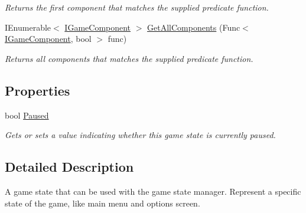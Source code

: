 \begin{DoxyCompactItemize}
\begin{DoxyCompactList}\small\item\em Returns the first component that matches the supplied predicate function. \end{DoxyCompactList}\item 
I\-Enumerable$<$ \hyperlink{interface_tri_devs_1_1_tri_engine_1_1_interfaces_1_1_i_game_component}{I\-Game\-Component} $>$ \hyperlink{interface_tri_devs_1_1_tri_engine_1_1_state_management_1_1_i_game_state_ae644df89b412d1803ae5000592aadb2b}{Get\-All\-Components} (Func$<$ \hyperlink{interface_tri_devs_1_1_tri_engine_1_1_interfaces_1_1_i_game_component}{I\-Game\-Component}, bool $>$ func)
\begin{DoxyCompactList}\small\item\em Returns all components that matches the supplied predicate function. \end{DoxyCompactList}\end{DoxyCompactItemize}
\subsection*{Properties}
\begin{DoxyCompactItemize}
\item 
bool \hyperlink{interface_tri_devs_1_1_tri_engine_1_1_state_management_1_1_i_game_state_aed69d2f08c02fbae787f7d8fb41186b8}{Paused}
\begin{DoxyCompactList}\small\item\em Gets or sets a value indicating whether this game state is currently paused. \end{DoxyCompactList}\end{DoxyCompactItemize}


\subsection{Detailed Description}
A game state that can be used with the game state manager. Represent a specific state of the game, like main menu and options screen. 



